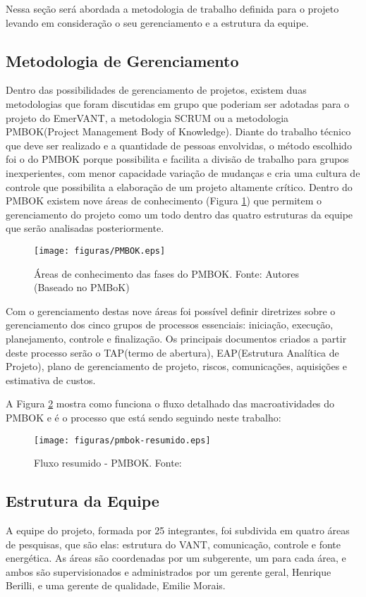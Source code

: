 Nessa seção será abordada a metodologia de trabalho definida para o projeto levando em consideração o seu gerenciamento e a estrutura da equipe.
\subsection{Metodologia de Gerenciamento}

Dentro das possibilidades de gerenciamento de projetos, existem duas metodologias que foram discutidas em grupo que poderiam ser adotadas para o projeto do EmerVANT, a metodologia SCRUM ou a metodologia PMBOK(Project Management Body of Knowledge). Diante do trabalho técnico que deve ser realizado e a quantidade de pessoas envolvidas, o método escolhido foi o do PMBOK porque possibilita e facilita a divisão de trabalho para grupos inexperientes, com menor capacidade variação de mudanças e cria uma cultura de controle que possibilita a elaboração de um projeto altamente crítico. Dentro do PMBOK existem nove áreas de conhecimento (Figura \ref{fig:metodologia}) que permitem o gerenciamento do projeto como um todo dentro das quatro estruturas da equipe que serão analisadas posteriormente.

 \begin{figure}[H]
	\centering
	  \texttt{[image: figuras/PMBOK.eps]}
	\caption[Áreas de conhecimento das fases do PMBOK]{Áreas de conhecimento das fases do PMBOK. Fonte: Autores (Baseado no PMBoK)}
	\label{fig:metodologia}
\end{figure}

Com o gerenciamento destas nove áreas foi possível definir diretrizes sobre o gerenciamento dos cinco grupos de processos essenciais: iniciação, execução, planejamento, controle e finalização. Os principais documentos criados a partir deste processo serão o TAP(termo de abertura), EAP(Estrutura Analítica de Projeto), plano de gerenciamento de projeto, riscos, comunicações, aquisições e estimativa de custos.

A Figura \ref{fig:pmbok} mostra como funciona o fluxo detalhado das macroatividades do PMBOK e é o processo que está sendo seguindo neste trabalho:

\begin{figure}[H]
		\texttt{[image: figuras/pmbok-resumido.eps]}
	\caption[Fluxo resumido - PMBOK]{Fluxo resumido - PMBOK. Fonte: \cite{pmbok}}
	\label{fig:pmbok}
\end{figure}

\subsection{Estrutura da Equipe}
A equipe do projeto, formada por 25 integrantes, foi subdivida em quatro áreas de pesquisas, que são elas: estrutura do VANT, comunicação, controle e fonte energética. As áreas são coordenadas por um subgerente, um para cada área, e ambos são supervisionados e administrados por um gerente geral, Henrique Berilli, e uma gerente de qualidade, Emilie Morais.

